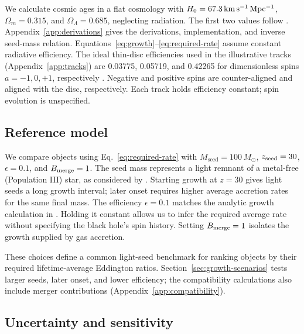 \documentclass[pdflatex,sn-basic]{sn-jnl}
\newcommand{\mseed}{M_{\mathrm{seed}}}
\begin{document}
We calculate cosmic ages in a flat cosmology with
$H_0=67.3\,{\rm km\,s^{-1}\,Mpc^{-1}}$, $\Omega_m=0.315$, and
$\Omega_\Lambda=0.685$, neglecting radiation. The first two values follow
\citet{dayal2024}. Appendix~\ref{app:derivations} gives the derivations,
implementation, and inverse seed-mass relation.
Equations~\ref{eq:growth}--\ref{eq:required-rate} assume constant radiative efficiency.
The ideal thin-disc efficiencies used in the illustrative tracks
(Appendix~\ref{app:tracks}) are
0.03775, 0.05719, and 0.42265 for dimensionless spins $a=-1,0,+1$,
respectively \citep{bardeen1972}. Negative and positive spins are counter-aligned
and aligned with the disc, respectively. Each track holds efficiency constant;
spin evolution is unspecified.

\subsection{Reference model}

We compare objects using Eq.~\ref{eq:required-rate} with
$\mseed=100\,M_\odot$, $z_{\rm seed}=30$, $\epsilon=0.1$, and
$B_{\rm merge}=1$. The seed mass represents a light remnant of a metal-free
(Population III) star, as considered by \citet{dayal2024}.
Starting growth at $z=30$ gives light seeds a long growth interval;
later onset requires higher average accretion rates for the same final mass.
The efficiency $\epsilon=0.1$ matches the analytic growth calculation in
\citet{dayal2024}. Holding it constant allows us to infer the required
average rate without specifying the black hole's spin history.
Setting $B_{\rm merge}=1$ isolates the growth supplied by gas accretion.

These choices define a common light-seed benchmark for ranking objects by
their required lifetime-average Eddington ratios. Section~\ref{sec:growth-scenarios}
tests larger seeds, later onset, and lower efficiency; the compatibility
calculations also include merger contributions (Appendix~\ref{app:compatibility}).

\subsection{Uncertainty and sensitivity}
\label{sec:uncertainty}
\end{document}
